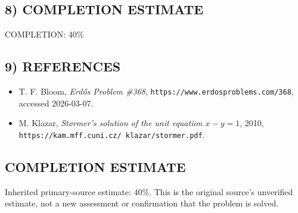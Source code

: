 \subsection*{8) COMPLETION ESTIMATE}
COMPLETION: 40\%

\subsection*{9) REFERENCES}
\begin{itemize}
\item[Bloom368] T. F. Bloom, \emph{Erd\H{o}s Problem \#368}, \texttt{https://www.erdosproblems.com/368}, accessed 2026-03-07.
\item[Klazar] M. Klazar, \emph{St\o rmer's solution of the unit equation $x-y=1$}, 2010, \texttt{https://kam.mff.cuni.cz/~klazar/stormer.pdf}.
\end{itemize}


\subsection*{COMPLETION ESTIMATE}
Inherited primary-source estimate: $40\%$. This is the original source's unverified estimate, not a new assessment or confirmation that the problem is solved.
